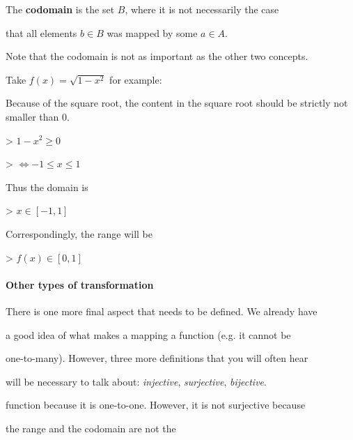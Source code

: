 The \textbf{codomain} is the set $B$, where it is not necessarily the case

that all elements $b\in B$ was mapped by some $a\in A$.






Note that the codomain is not as important as the other two concepts.



Take $f(x)=\sqrt{1-x^2}$ for example:



Because of the square root, the content in the square root should be strictly not smaller than 0.



> $1-x^2\geq0$



> $\Leftrightarrow -1\leq x\leq 1$



Thus the domain is



> $x\in[-1,1]$



Correspondingly, the range will be



> $f(x)\in[0,1]$



\paragraph{Other types of transformation}



There is one more final aspect that needs to be defined. We already have

a good idea of what makes a mapping a function (e.g. it cannot be

one-to-many). However, three more definitions that you will often hear

will be necessary to talk about: \textit{injective}, \textit{surjective}, \textit{bijective}.




function because it is one-to-one. However, it is not surjective because

the range and the codomain are not the

